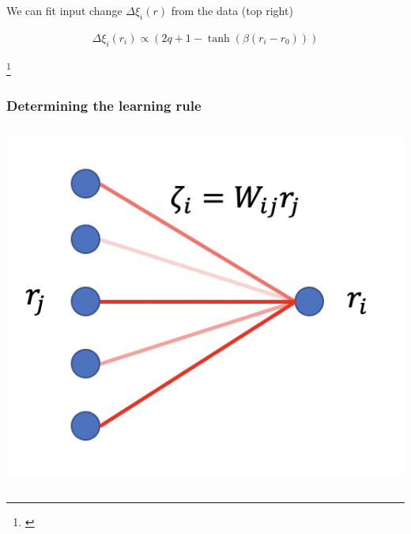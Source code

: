 \documentclass{beamer}
\begin{document}
\begin{frame}[plain]
\begin{columns}[T]
\end{columns}

\vspace{0.2in}

We can fit input change $\Delta \xi_{i}(r)$ from the data (top right)

\begin{align*}
\Delta \xi_{i}(r_{i}) \propto (2q + 1 - \tanh (\beta (r_{i}-r_{0})))
\end{align*}

\footnote{\cite{lim}}

\end{frame}


\begin{frame}[plain]
\frametitle{Determining the learning rule}


\begin{columns}[T]
\begin{column}{.3\textwidth}
\begin{center}
\includegraphics[scale=0.5]{net}
\end{center}
\end{column}


\end{columns}
\end{frame}
\end{document}
